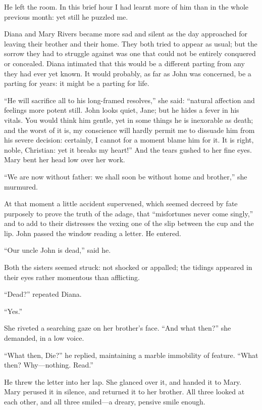 He left the room. In this brief hour I had learnt more of him than in
the whole previous month: yet still he puzzled me.

Diana and Mary Rivers became more sad and silent as the day approached
for leaving their brother and their home. They both tried to appear as
usual; but the sorrow they had to struggle against was one that could
not be entirely conquered or concealed. Diana intimated that this would
be a different parting from any they had ever yet known. It would
probably, as far as \St{} John was concerned, be a parting for years: it
might be a parting for life.

\enquote{He will sacrifice all to his long-framed resolves,} she said:
\enquote{natural affection and feelings more potent still. \St{} John
	looks quiet, Jane; but he hides a fever in his vitals. You would think
	him gentle, yet in some things he is inexorable as death; and the worst
	of it is, my conscience will hardly permit me to dissuade him from his
	severe decision: certainly, I cannot for a moment blame him for it. It
	is right, noble, Christian: yet it breaks my heart!} And the tears
gushed to her fine eyes. Mary bent her head low over her work.

\enquote{We are now without father: we shall soon be without home and
	brother,} she murmured.

At that moment a little accident supervened, which seemed decreed by
fate purposely to prove the truth of the adage, that
\enquote{misfortunes never come singly,} and to add to their distresses
the vexing one of the slip between the cup and the lip. \St{} John passed
the window reading a letter. He entered.

\enquote{Our uncle John is dead,} said he.

Both the sisters seemed struck: not shocked or appalled; the tidings
appeared in their eyes rather momentous than afflicting.

\enquote{Dead?} repeated Diana.

\enquote{Yes.}

She riveted a searching gaze on her brother's face. \enquote{And what
	then?} she demanded, in a low voice.

\enquote{What then, Die?} he replied, maintaining a marble immobility of
feature. \enquote{What then? Why---nothing. Read.}

He threw the letter into her lap. She glanced over it, and handed it to
Mary. Mary perused it in silence, and returned it to her brother. All
three looked at each other, and all three smiled---a dreary, pensive
smile enough.

